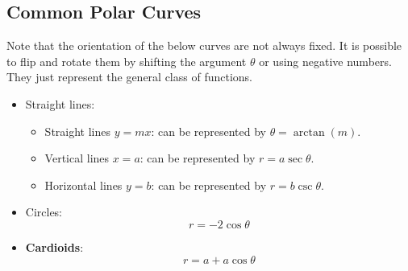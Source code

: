 \documentclass{article}
\begin{document}
    \subsection{Common Polar Curves}
    Note that the orientation of the below curves are not always fixed. It is possible to flip and rotate them by shifting the argument $\theta$ or using negative numbers. They just represent the general class of functions.
    \begin{itemize}
        \item Straight lines:
        \begin{itemize}
            \item Straight lines $y=mx$: can be represented by $\theta = \arctan(m)$.
            \item Vertical lines $x=a$: can be represented by $r=a\sec\theta$.
            \item Horizontal lines $y=b$: can be represented by $r=b\csc\theta$.
        \end{itemize}
            \item Circles:
            \begin{equation}
                r = -2\cos\theta
            \end{equation}
            \begin{center}
            \end{center}
            \item \textbf{Cardioids}:
            \begin{equation}
                r= a + a\cos\theta 
            \end{equation}
    

\end{itemize}
\end{document}
